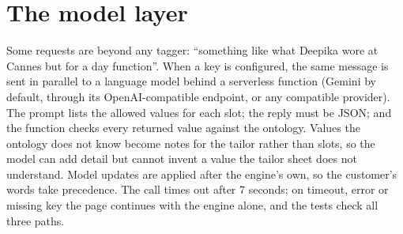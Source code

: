 \section{The model layer}
Some requests are beyond any tagger: ``something like what Deepika wore at Cannes but for a day function''. When a key is configured, the same message is sent in parallel to a language model behind a serverless function (Gemini by default, through its OpenAI-compatible endpoint, or any compatible provider). The prompt lists the allowed values for each slot; the reply must be JSON; and the function checks every returned value against the ontology. Values the ontology does not know become notes for the tailor rather than slots, so the model can add detail but cannot invent a value the tailor sheet does not understand. Model updates are applied after the engine's own, so the customer's words take precedence. The call times out after 7 seconds; on timeout, error or missing key the page continues with the engine alone, and the tests check all three paths.
